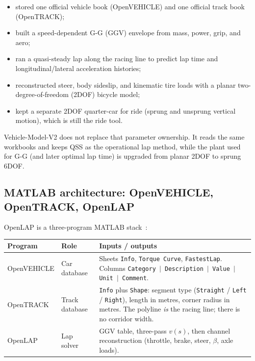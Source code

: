 \documentclass[11pt,letterpaper]{article}
\begin{document}
\begin{itemize}[leftmargin=1.6em]
  \item stored one official vehicle book (OpenVEHICLE) and one official
        track book (OpenTRACK);
  \item built a speed-dependent G-G (GGV) envelope from mass, power,
        grip, and aero;
  \item ran a quasi-steady lap along the racing line to predict lap
        time and longitudinal/lateral acceleration histories;
  \item reconstructed steer, body sideslip, and kinematic tire loads
        with a planar two-degree-of-freedom (2DOF) bicycle model;
  \item kept a separate 2DOF quarter-car for ride (sprung and unsprung
        vertical motion), which is still the ride tool.
\end{itemize}

Vehicle-Model-V2 does not replace that parameter ownership. It reads
the same workbooks and keeps QSS as the operational lap method, while
the plant used for G-G (and later optimal lap time) is upgraded from
planar 2DOF to sprung 6DOF.

\subsection{MATLAB architecture: OpenVEHICLE, OpenTRACK, OpenLAP}
\label{sec:matlab-arch}

OpenLAP is a three-program MATLAB stack~\cite{openlap}:

\begin{center}
\begin{tabular}{@{}llp{7.4cm}@{}}
\toprule
Program & Role & Inputs / outputs \\
\midrule
OpenVEHICLE & Car database & Sheets \texttt{Info}, \texttt{Torque Curve},
  \texttt{FastestLap}. Columns
  \texttt{Category $|$ Description $|$ Value $|$ Unit $|$ Comment}. \\
OpenTRACK & Track database & \texttt{Info} plus \texttt{Shape}:
  segment type (\texttt{Straight} / \texttt{Left} / \texttt{Right}),
  length in metres, corner radius in metres. The polyline \emph{is}
  the racing line; there is no corridor width. \\
OpenLAP & Lap solver & GGV table, three-pass $v(s)$, then channel
  reconstruction (throttle, brake, steer, $\beta$, axle loads). \\
\bottomrule
\end{tabular}
\end{center}
\end{document}
